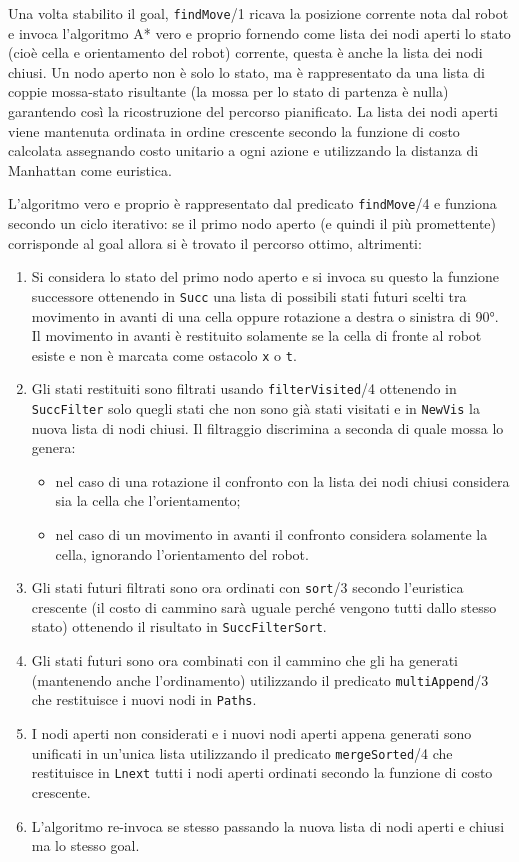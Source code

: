 Una volta stabilito il goal, \texttt{findMove}/1 ricava la posizione corrente nota dal robot e invoca l'algoritmo A* vero e proprio fornendo come lista dei nodi aperti lo stato (cioè cella e orientamento del robot) corrente, questa è anche la lista dei nodi chiusi. Un nodo aperto non è solo lo stato, ma è rappresentato da una lista di coppie mossa-stato risultante (la mossa per lo stato di partenza è nulla) garantendo così la ricostruzione del percorso pianificato. La lista dei nodi aperti viene mantenuta ordinata in ordine crescente secondo la funzione di costo calcolata assegnando costo unitario a ogni azione e utilizzando la distanza di Manhattan come euristica.

L'algoritmo vero e proprio è rappresentato dal predicato \texttt{findMove}/4 e funziona secondo un ciclo iterativo: se il primo nodo aperto (e quindi il più promettente) corrisponde al goal allora si è trovato il percorso ottimo, altrimenti:
\begin{enumerate}
	\item Si considera lo stato del primo nodo aperto e si invoca su questo la funzione successore ottenendo in \texttt{Succ} una lista di possibili stati futuri scelti tra movimento in avanti di una cella oppure rotazione a destra o sinistra di \ang{90}. Il movimento in avanti è restituito solamente se la cella di fronte al robot esiste e non è marcata come ostacolo \texttt{x} o \texttt{t}.
	\item Gli stati restituiti sono filtrati usando \texttt{filterVisited}/4 ottenendo in \texttt{SuccFilter} solo quegli stati che non sono già stati visitati e in \texttt{NewVis} la nuova lista di nodi chiusi. Il filtraggio discrimina a seconda di quale mossa lo genera:
	\begin{itemize}
		\item nel caso di una rotazione il confronto con la lista dei nodi chiusi considera sia la cella che l'orientamento;
		\item nel caso di un movimento in avanti il confronto considera solamente la cella, ignorando l'orientamento del robot.
	\end{itemize}
	\item Gli stati futuri filtrati sono ora ordinati con \texttt{sort}/3 secondo l'euristica crescente (il costo di cammino sarà uguale perché vengono tutti dallo stesso stato) ottenendo il risultato in \texttt{SuccFilterSort}.
	\item Gli stati futuri sono ora combinati con il cammino che gli ha generati (mantenendo anche l'ordinamento) utilizzando il predicato \texttt{multiAppend}/3 che  restituisce i nuovi nodi in \texttt{Paths}.
	\item I nodi aperti non considerati e i nuovi nodi aperti appena generati sono unificati in un'unica lista utilizzando il predicato \texttt{mergeSorted}/4 che restituisce in \texttt{Lnext} tutti i nodi aperti ordinati secondo la funzione di costo crescente.
	\item L'algoritmo re-invoca se stesso passando la nuova lista di nodi aperti e chiusi ma lo stesso goal.
\end{enumerate}

